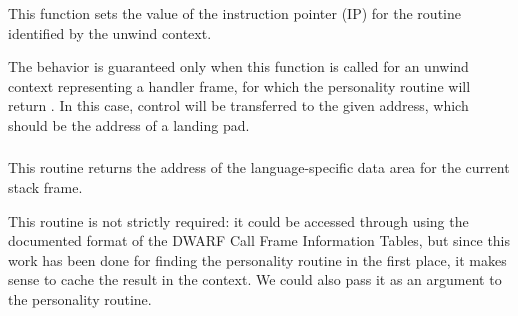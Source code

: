 \subsubsection{}

This function sets the value of the instruction pointer (IP) for the
routine identified by the unwind context.

The behavior is guaranteed only when this function is called for an
unwind context representing a handler frame, for which the personality
routine will return . In this case, control will
be transferred to the given address, which should be the address of a
landing pad.

\subsubsection{}


This routine returns the address of the language-specific data area for
the current stack frame.

This routine is not strictly required: it could be accessed through
 using the documented format of the DWARF Call Frame
Information Tables, but since this work has been done for finding the
personality routine in the first place, it makes sense to cache the
result in the context.
We could also pass it as an argument to the personality routine.

\subsubsection{}


